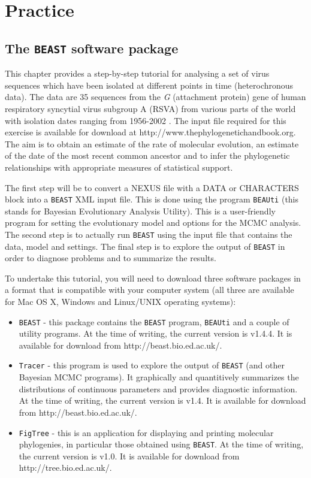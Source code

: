 \documentclass[cup7b, english]{cupbook}
\begin{document}
\section{Practice}

\subsection{The \texttt{BEAST} software package}

This chapter provides a step-by-step tutorial for analysing a set of virus sequences which have been isolated
at different points in time (heterochronous data). The data are 35 sequences from the {\it G} (attachment protein) gene
of human respiratory syncytial virus subgroup A (RSVA) from various parts of the world with isolation dates ranging from 1956-2002
\cite{Zlateva2004}. The input file required for this exercise is available for download at http://www.thephylogenetichandbook.org. The aim is to obtain an estimate of the rate of molecular evolution, an estimate of the date of
the most recent common ancestor and to infer the phylogenetic relationships with appropriate measures of statistical support.

The first step will be to convert a NEXUS file with a DATA or CHARACTERS block into a \texttt{BEAST} XML input file.
This is done using the program \texttt{BEAUti} (this stands for Bayesian Evolutionary Analysis Utility). This is a
user-friendly program for setting the evolutionary model and options for the MCMC analysis. The second step
is to actually run \texttt{BEAST} using the input file that contains the data, model and settings. The final step is to
explore the output of \texttt{BEAST} in order to diagnose problems and to summarize the results.

To undertake this tutorial, you will need to download three software packages in a format that is compatible
with your computer system (all three are available for Mac OS X, Windows and Linux/UNIX operating systems):

\begin{itemize}
\item \texttt{BEAST} - this package contains the \texttt{BEAST} program, \texttt{BEAUti} and a couple of utility programs. At the time of writing,
the current version is v1.4.4. It is available for download from http://beast.bio.ed.ac.uk/.
\item \texttt{Tracer} - this program is used to explore the output of \texttt{BEAST} (and other Bayesian MCMC programs). It
graphically and quantitively summarizes the distributions of continuous parameters and provides diagnostic
information. At the time of writing, the current version is v1.4. It is available for download from http://beast.bio.ed.ac.uk/.
\item \texttt{FigTree} - this is an application for displaying and printing molecular phylogenies, in particular
those obtained using \texttt{BEAST}. At the time of writing, the current version is v1.0. It is available for download
from http://tree.bio.ed.ac.uk/.
\end{itemize}
\end{document}
